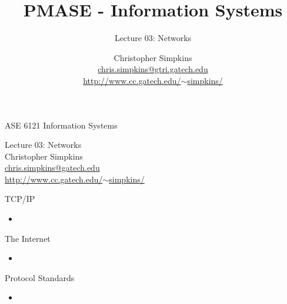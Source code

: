 \documentclass{beamer}
\title[Information Systems] %
{PMASE - Information Systems}
\subtitle{Lecture 03: Networks}
\author[Chris Simpkins] %
{Christopher Simpkins\\\href{mailto:chris.simpkins@gtri.gatech.edu}{chris.simpkins@gtri.gatech.edu}\\\href{http://www.cc.gatech.edu/~simpkins/}{http://www.cc.gatech.edu/$\sim$simpkins/}}
\institute[GTRI] %
\date[] %
{}
\begin{document}
\begin{frame}{ASE 6121 Information Systems}

\begin{center}
{\LARGE Lecture 03: Networks}\\
\vspace{.2in}
{\Large Christopher Simpkins}\\
{\large \href{mailto:chris.simpkins@gatech.edu}{chris.simpkins@gatech.edu}}\\
{\large \href{http://www.cc.gatech.edu/~simpkins/}{http://www.cc.gatech.edu/$\sim$simpkins/}}
\end{center}

\end{frame}


\begin{frame}{TCP/IP}

\begin{itemize}
\item
\end{itemize}

\end{frame}

\begin{frame}{The Internet}

\begin{itemize}
\item
\end{itemize}

\end{frame}

\begin{frame}{Protocol Standards}

\begin{itemize}
\item
\end{itemize}

\end{frame}
\end{document}
